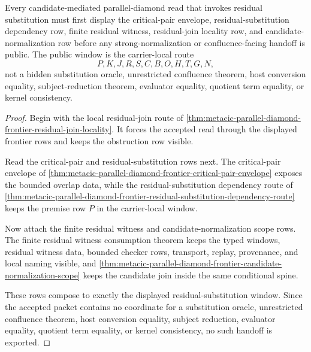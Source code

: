 \begin{theorem}
\label{thm:metacic-parallel-diamond-residual-substitution-window}
Every candidate-mediated parallel-diamond read that invokes residual substitution must first display the critical-pair envelope, residual-substitution dependency row, finite residual witness, residual-join locality row, and candidate-normalization row before any strong-normalization or confluence-facing handoff is public. The public window is the carrier-local route
$$
P,K,J,R,S,C,B,O,H,T,G,N ,
$$
not a hidden substitution oracle, unrestricted confluence theorem, host conversion equality, subject-reduction theorem, evaluator equality, quotient term equality, or kernel consistency.
\end{theorem}
\begin{proof}
Begin with the local residual-join route of \autoref{thm:metacic-parallel-diamond-frontier-residual-join-locality}. It forces the accepted read through the displayed frontier rows and keeps the obstruction row visible.

Read the critical-pair and residual-substitution rows next. The critical-pair envelope of \autoref{thm:metacic-parallel-diamond-frontier-critical-pair-envelope} exposes the bounded overlap data, while the residual-substitution dependency route of \autoref{thm:metacic-parallel-diamond-frontier-residual-substitution-dependency-route} keeps the premise row $P$ in the carrier-local window.

Now attach the finite residual witness and candidate-normalization scope rows. The finite residual witness consumption theorem keeps the typed windows, residual witness data, bounded checker rows, transport, replay, provenance, and local naming visible, and \autoref{thm:metacic-parallel-diamond-frontier-candidate-normalization-scope} keeps the candidate join inside the same conditional spine.

These rows compose to exactly the displayed residual-substitution window. Since the accepted packet contains no coordinate for a substitution oracle, unrestricted confluence theorem, host conversion equality, subject reduction, evaluator equality, quotient term equality, or kernel consistency, no such handoff is exported.
\end{proof}

